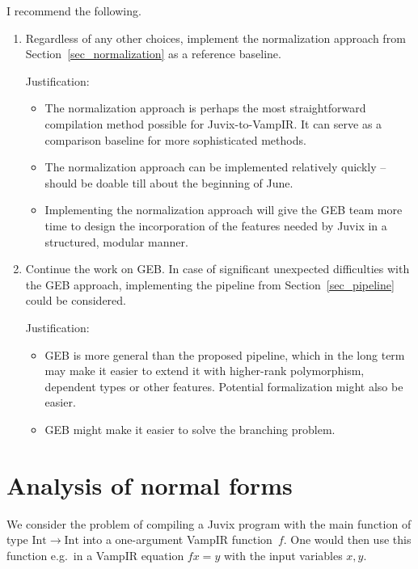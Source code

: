 I recommend the following.
\begin{enumerate}
\item Regardless of any other choices, implement the normalization
  approach from Section~\ref{sec_normalization} as a reference
  baseline.
  \medskip

  Justification:
  \begin{itemize}
  \item The normalization approach is perhaps the most straightforward
    compilation method possible for Juvix-to-VampIR. It can serve as a
    comparison baseline for more sophisticated methods.
  \item The normalization approach can be implemented relatively
    quickly -- should be doable till about the beginning of June.
  \item Implementing the normalization approach will give the GEB team
    more time to design the incorporation of the features needed by
    Juvix in a structured, modular manner.
  \end{itemize}
\item Continue the work on GEB. In case of significant unexpected
  difficulties with the GEB approach, implementing the pipeline from
  Section~\ref{sec_pipeline} could be considered.
  \medskip

  Justification:
  \begin{itemize}
  \item GEB is more general than the proposed pipeline, which in the
    long term may make it easier to extend it with higher-rank
    polymorphism, dependent types or other features. Potential
    formalization might also be easier.
  \item GEB might make it easier to solve the branching problem.
  \end{itemize}
\end{enumerate}


\clearpage
\appendix

\renewcommand{\thesection}{\Alph{section}}

\section{Analysis of normal forms}\label{sec_normal_forms}

We consider the problem of compiling a Juvix program with the main
function of type $\mathrm{Int} \to \mathrm{Int}$ into a one-argument
VampIR function~$f$. One would then use this function e.g.~in a VampIR
equation $f x = y$ with the input variables $x,y$.

